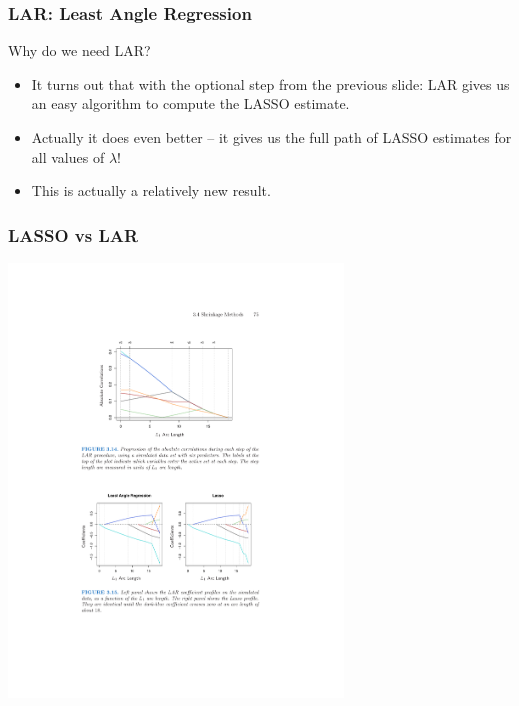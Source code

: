 \documentclass[xcolor=pdftex,dvipsnames,table,mathserif]{beamer}
\begin{document}
\begin{frame}
\frametitle{LAR: Least Angle Regression}
Why do we need LAR?
\begin{itemize}
\item It turns out that with the optional step from the previous slide: LAR gives us an easy algorithm to compute the LASSO estimate.
\item Actually it does even better -- it gives us the full path of LASSO estimates for all values of $\lambda$!
\item This is actually a relatively new result.
\end{itemize}
\end{frame}


\begin{frame}
\frametitle{LASSO vs LAR}
\begin{center}
\includegraphics[width=3.5in]{./resources/lar-lasso}
\end{center}
\end{frame}
\end{document}
